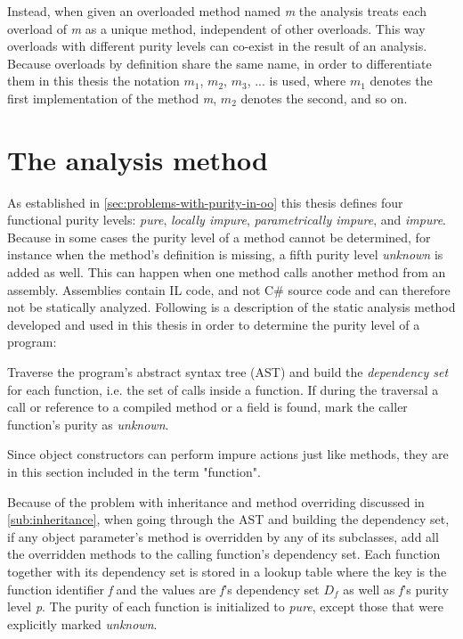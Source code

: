 \documentclass[a4paper,12pt]{article}
\begin{document}
Instead, when given an overloaded method named \textit{m} the analysis treats each overload of \textit{m} as a unique method, independent of other overloads. This way overloads with different purity levels can co-exist in the result of an analysis. Because overloads by definition share the same name, in order to differentiate them in this thesis the notation $m_1$, $m_2$, $m_3$, ... is used, where $m_1$ denotes the first implementation of the method \textit{m}, $m_2$ denotes the second, and so on.

\section{The analysis method} \label{sec:the-analysis-method}

As established in \autoref{sec:problems-with-purity-in-oo} this thesis defines four functional purity levels: \textit{pure}, \textit{locally impure}, \textit{parametrically impure}, and \textit{impure}. Because in some cases the purity level of a method cannot be determined, for instance when the method's definition is missing, a fifth purity level \textit{unknown} is added as well. This can happen when one method calls another method from an assembly. Assemblies contain IL code, and not C\# source code and can therefore not be statically analyzed. Following is a description of the static analysis method developed and used in this thesis in order to determine the purity level of a program:

Traverse the program's abstract syntax tree (AST) and build the \textit{dependency set} for each function, i.e. the set of calls inside a function. If during the traversal a call or reference to a compiled method or a field is found, mark the caller function's purity as \textit{unknown}.

Since object constructors can perform impure actions just like methods, they are in this section included in the term "function".

Because of the problem with inheritance and method overriding discussed in \autoref{sub:inheritance}, when going through the AST and building the dependency set, if any object parameter's method is overridden by any of its subclasses, add all the overridden methods to the calling function's dependency set. Each function together with its dependency set is stored in a lookup table where the key is the function identifier \textit{f} and the values are \textit{f}'s dependency set $D_f$ as well as \textit{f}'s purity level \textit{p}. The purity of each function is initialized to \textit{pure}, except those that were explicitly marked \textit{unknown}.
\end{document}
